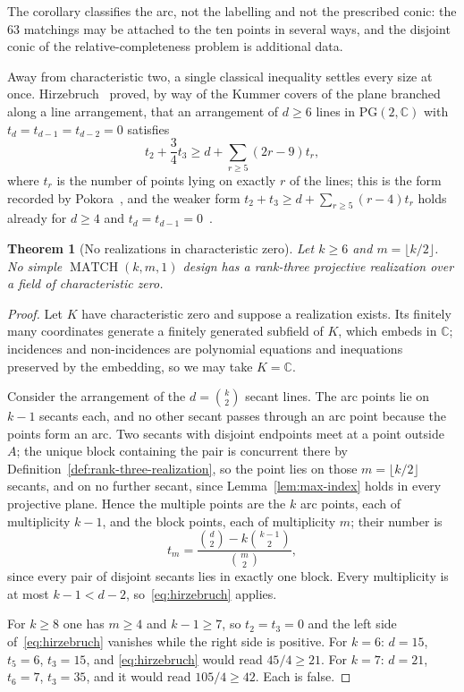 \documentclass[11pt]{article}
\newtheorem{theorem}{Theorem}[section]
\theoremstyle{definition}
\theoremstyle{remark}
\newcommand{\PG}{\mathrm{PG}}
\begin{document}
The corollary classifies the arc, not the labelling and not the prescribed
conic: the \(63\) matchings may be attached to the ten points in several
ways, and the disjoint conic of the relative-completeness problem is
additional data.

Away from characteristic two, a single classical inequality settles every
size at once.  Hirzebruch~\cite{Hirzebruch1983} proved, by way of the
Kummer covers of the plane branched along a line arrangement, that an
arrangement of \(d\ge6\) lines in \(\PG(2,\mathbb C)\) with
\(t_d=t_{d-1}=t_{d-2}=0\) satisfies
\begin{equation}
 t_2+\frac34t_3\ge d+\sum_{r\ge5}(2r-9)t_r,
\label{eq:hirzebruch}
\end{equation}
where \(t_r\) is the number of points lying on exactly \(r\) of the lines;
this is the form recorded by Pokora~\cite[Remark~2.9]{Pokora2020}, and the
weaker form \(t_2+t_3\ge d+\sum_{r\ge5}(r-4)t_r\) holds already for
\(d\ge4\) and \(t_d=t_{d-1}=0\)~\cite[Theorem~1.5]{Pokora2020}.

\begin{theorem}[No realizations in characteristic zero]
\label{thm:char-zero-obstruction}
Let \(k\ge6\) and \(m=\lfloor k/2\rfloor\).  No simple
\(\operatorname{MATCH}(k,m,1)\) design has a rank-three projective
realization over a field of characteristic zero.
\end{theorem}

\begin{proof}
Let \(K\) have characteristic zero and suppose a realization exists.  Its
finitely many coordinates generate a finitely generated subfield of \(K\),
which embeds in \(\mathbb C\); incidences and non-incidences are polynomial
equations and inequations preserved by the embedding, so we may take
\(K=\mathbb C\).

Consider the arrangement of the \(d=\binom{k}{2}\) secant lines.  The arc
points lie on \(k-1\) secants each, and no other secant passes through an
arc point because the points form an arc.  Two secants with disjoint
endpoints meet at a point outside \(A\); the unique block containing the
pair is concurrent there by Definition~\ref{def:rank-three-realization}, so
the point lies on those \(m=\lfloor k/2\rfloor\) secants, and on no
further secant, since Lemma~\ref{lem:max-index} holds in every projective
plane.  Hence the multiple points are the \(k\) arc
points, each of multiplicity \(k-1\), and the block points, each of
multiplicity \(m\); their number is
\[
 t_m=\frac{\binom{d}{2}-k\binom{k-1}{2}}{\binom m2},
\]
since every pair of disjoint secants lies in exactly one block.  Every
multiplicity is at most \(k-1<d-2\), so~\eqref{eq:hirzebruch} applies.

For \(k\ge8\) one has \(m\ge4\) and \(k-1\ge7\), so \(t_2=t_3=0\) and the
left side of~\eqref{eq:hirzebruch} vanishes while the right side is
positive.  For \(k=6\): \(d=15\), \(t_5=6\), \(t_3=15\), and
\eqref{eq:hirzebruch} would read \(45/4\ge21\).  For \(k=7\): \(d=21\),
\(t_6=7\), \(t_3=35\), and it would read \(105/4\ge42\).  Each is false.
\end{proof}
\end{document}
